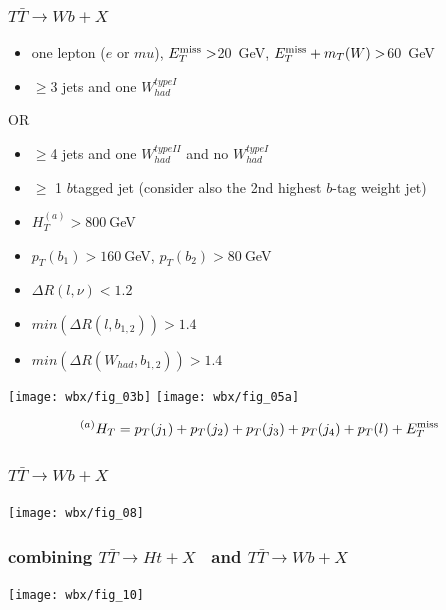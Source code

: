 \documentclass[xcolor=dvipsnames,10pt]{beamer}
\begin{document}
\begin{frame}\frametitle{$T\bar{T}\to Wb+X$~\cite{ATLAS-CONF-2013-060}}
\scriptsize\centering

\begin{minipage}{.45\textwidth}\centering
    \begin{itemize}
    \item one lepton ($e$ or $mu$), ${E}^{\rm miss}_T >$20~GeV, ${E}^{\rm miss}_T + m_T(W)>$60~GeV
    \item $\geq$3 jets and one $W^{type I}_{had}$
    \end{itemize}
    OR 
    \begin{itemize}
    \item $\geq$4 jets and one $W^{type II}_{had}$ and no $W^{type I}_{had}$
    \item $\geq$ 1 $b$tagged jet (consider also the 2nd highest $b$-tag weight jet)
    \item $H_T^{(a)}>800~$GeV
    \item $p_T(b_1)>160~$GeV, $p_T(b_2)>80~$GeV
    \item $\Delta R(l,\nu) < 1.2$
    \item $min(\Delta R(l,b_{1,2})) > 1.4$
    \item $min(\Delta R(W_{had},b_{1,2})) > 1.4$
    \end{itemize}
\end{minipage}\begin{minipage}{.55\textwidth}\centering  

\texttt{[image: wbx/fig\_03b]}
\texttt{[image: wbx/fig\_05a]}

\end{minipage}


\tiny $$^{(a)} H_T = p_T(j_1) + p_T(j_2) + p_T(j_3) + p_T(j_4) + p_T(l) + E_T^{\rm miss}$$
\end{frame}


\begin{frame}\frametitle{$T\bar{T}\to Wb+X$~\cite{ATLAS-CONF-2013-060}}
\footnotesize\centering

       \texttt{[image: wbx/fig\_08]}

\end{frame}


\begin{frame}\frametitle{combining $T\bar{T}\to Ht+X$~\cite{ATLAS-CONF-2013-018} and $T\bar{T}\to Wb+X$~\cite{ATLAS-CONF-2013-060}}
\footnotesize\centering

       \texttt{[image: wbx/fig\_10]}

\end{frame}
\end{document}
